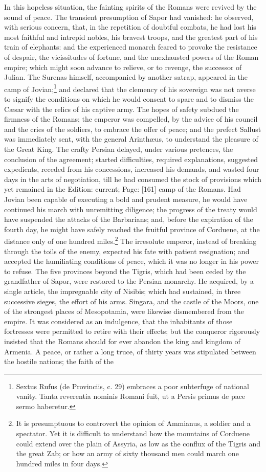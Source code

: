 In this hopeless situation, the fainting spirits of the Romans were revived by the sound of peace. The transient presumption of Sapor had vanished: he observed, with serious concern, that, in the repetition of doubtful combats, he had lost his most faithful and intrepid nobles, his bravest troops, and the greatest part of his train of elephants: and the experienced monarch feared to provoke the resistance of despair, the vicissitudes of fortune, and the unexhausted powers of the Roman empire; which might soon advance to relieve, or to revenge, the successor of Julian. The Surenas himself, accompanied by another satrap, appeared in the camp of Jovian;\footnote{Sextus Rufus (de Provinciis, c. 29) embraces a poor subterfuge of national vanity. Tanta reverentia nominis Romani fuit, ut a Persis primus de pace sermo haberetur.} and declared that the clemency of his sovereign was not averse to signify the conditions on which he would consent to spare and to dismiss the Cæsar with the relics of his captive army. The hopes of safety subdued the firmness of the Romans; the emperor was compelled, by the advice of his council and the cries of the soldiers, to embrace the offer of peace; and the prefect Sallust was immediately sent, with the general Arinthæus, to understand the pleasure of the Great King. The crafty Persian delayed, under various pretences, the conclusion of the agreement; started difficulties, required explanations, suggested expedients, receded from his concessions, increased his demands, and wasted four days in the arts of negotiation, till he had consumed the stock of provisions which yet remained in the Edition: current; Page: [161] camp of the Romans. Had Jovian been capable of executing a bold and prudent measure, he would have continued his march with unremitting diligence; the progress of the treaty would have suspended the attacks of the Barbarians; and, before the expiration of the fourth day, he might have safely reached the fruitful province of Corduene, at the distance only of one hundred miles.\footnote{It is presumptuous to controvert the opinion of Ammianus, a soldier and a spectator. Yet it is difficult to understand how the mountains of Corduene could extend over the plain of Assyria, as low as the conflux of the Tigris and the great Zab; or how an army of sixty thousand men could march one hundred miles in four days.} The irresolute emperor, instead of breaking through the toils of the enemy, expected his fate with patient resignation; and accepted the humiliating conditions of peace, which it was no longer in his power to refuse. The five provinces beyond the Tigris, which had been ceded by the grandfather of Sapor, were restored to the Persian monarchy. He acquired, by a single article, the impregnable city of Nisibis; which had sustained, in three successive sieges, the effort of his arms. Singara, and the castle of the Moors, one of the strongest places of Mesopotamia, were likewise dismembered from the empire. It was considered as an indulgence, that the inhabitants of those fortresses were permitted to retire with their effects; but the conqueror rigorously insisted that the Romans should for ever abandon the king and kingdom of Armenia. A peace, or rather a long truce, of thirty years was stipulated between the hostile nations; the faith of the 